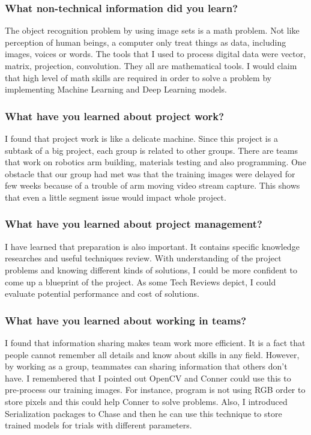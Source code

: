 \documentclass[10pt,journal,compsoc, draftclsnofoot,onecolumn]{IEEEtran}
\begin{document}
\subsubsection{What non-technical information did you learn?}
The object recognition problem by using image sets is a math problem. Not like perception of human beings, a computer only treat things as data, including images, voices or words. The tools that I used to process digital data were vector, matrix, projection, convolution. They all are mathematical tools. I would claim that high level of math skills are required in order to solve a problem by implementing Machine Learning and Deep Learning models.

\subsubsection{What have you learned about project work?}
I found that project work is like a delicate machine. Since this project is a subtask of a big project, each group is related to other groups. There are teams that work on robotics arm building, materials testing and also programming. One obstacle that our group had met was that the training images were delayed for few weeks because of a trouble of arm moving video stream capture. This shows that even a little segment issue would impact whole project. 

\subsubsection{What have you learned about project management?}
I have learned that preparation is also important. It contains specific knowledge researches and useful techniques review. With understanding of the project problems and knowing different kinds of solutions, I could be more confident to come up a blueprint of the project. As some Tech Reviews depict, I could evaluate potential performance and cost of solutions.

\subsubsection{What have you learned about working in teams?}
I found that information sharing makes team work more efficient. It is a fact that people cannot remember all details and know about skills in any field. However, by working as a group, teammates can sharing information that others don't have. I remembered that I pointed out OpenCV and Conner could use this to pre-process our training images. For instance, program is not using RGB order to store pixels and this could help Conner to solve problems. Also, I introduced Serialization packages to Chase and then he can use this technique to store trained models for trials with different parameters.
\end{document}

